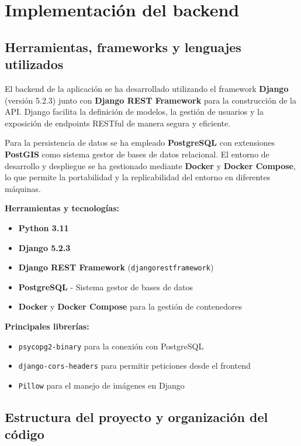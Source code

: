 \section{Implementación del backend}

\subsection{Herramientas, frameworks y lenguajes utilizados}

El backend de la aplicación se ha desarrollado utilizando el framework \textbf{Django} (versión 5.2.3) junto con \textbf{Django REST Framework} para la construcción de la API. Django facilita la definición de modelos, la gestión de usuarios y la exposición de endpoints RESTful de manera segura y eficiente.

Para la persistencia de datos se ha empleado \textbf{PostgreSQL} con extensiones \textbf{PostGIS} como sistema gestor de bases de datos relacional. El entorno de desarrollo y despliegue se ha gestionado mediante \textbf{Docker} y \textbf{Docker Compose}, lo que permite la portabilidad y la replicabilidad del entorno en diferentes máquinas.

\textbf{Herramientas y tecnologías:}
\begin{itemize}
    \item \textbf{Python 3.11}
    \item \textbf{Django 5.2.3} 
    \item \textbf{Django REST Framework} (\texttt{djangorestframework})
    \item \textbf{PostgreSQL} - Sistema gestor de bases de datos 
    \item \textbf{Docker} y \textbf{Docker Compose} para la gestión de contenedores
\end{itemize}

\textbf{Principales librerías:}
\begin{itemize}
    \item \texttt{psycopg2-binary} para la conexión con PostgreSQL
    \item \texttt{django-cors-headers} para permitir peticiones desde el frontend
    \item \texttt{Pillow} para el manejo de imágenes en Django
\end{itemize}


\subsection{Estructura del proyecto y organización del código}

